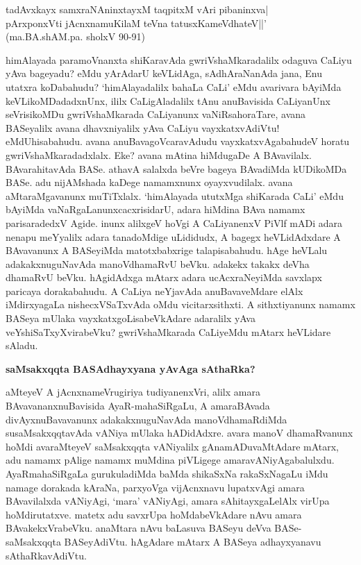 \begin{shloka}
tadAvxkayx samxraNAninxtayxM taqpitxM vAri pibaninxva|\\
pArxponxVti jAcnxnamuKilaM teVna tatusxKameVdhateV||'\\
\hfill(ma.BA.shAM.pa. sholxV 90-91)
\end{shloka}

himAlayada paramoVnanxta shiKaravAda gwriVshaMkaradalilx odaguva CaLiyu yAva bageyadu? eMdu yArAdarU keVLidAga, sAdhAraNanAda jana, Enu utatxra koDabahudu?  `himAlayadalilx bahaLa CaLi' eMdu avarivara bAyiMda keVLikoMDadadxnUnx, ililx CaLigAladalilx tAnu anuBavisida CaLiyanUnx seVrisikoMDu gwriVshaMkarada CaLiyanunx vaNiRsahoraTare, avana BASeyalilx avana dhavxniyalilx yAva CaLiyu vayxkatxvAdiVtu! eMdUhisabahudu. avana anuBavagoVcaravAdudu vayxkatxvAgabahudeV horatu gwriVshaMkaradadxlalx. Eke? avana mAtina hiMdugaDe A BAvavilalx. BAvarahitavAda BASe. athavA salalxda beVre bageya BAvadiMda kUDikoMDa BASe. adu nijAMshada kaDege namamxnunx oyayxvudilalx. avana aMtaraMgavanunx muTiTxlalx. `himAlayada ututxMga shiKarada CaLi' eMdu bAyiMda vaNaRgaLanunxcacxrisidarU, adara hiMdina BAva namamx parisaradedxV Agide. inunx alilxgeV hoVgi A CaLiyanenxV PiVlf mADi adara nenapu meYyalilx adara tanadoMdige uLididudx, A bagegx heVLidAdxdare A BAvavanunx A BASeyiMda matotxbabxrige talapisabahudu. hAge heVLalu adakakxnuguNavAda manoVdhamaRvU beVku. adakekx takakx deVha dhamaRvU beVku. hAgidAdxga mAtarx adara ucAcxraNeyiMda savxlapx paricaya dorakabahudu. A CaLiya neYjavAda anuBavaveMdare elAlx iMdirxyagaLa nishecxVSaTxvAda oMdu vicitarxsithxti. A sithxtiyanunx namamx BASeya mUlaka vayxkatxgoLisabeVkAdare adaralilx yAva veYshiSaTxyXvirabeVku? gwriVshaMkarada CaLiyeMdu mAtarx heVLidare sAladu.

\noindent
\textbf{saMsakxqqta BASAdhayxyana yAvAga sAthaRka?}\label{page27}

aMteyeV A jAcnxnameVrugiriya tudiyanenxVri, alilx amara BAvavananxnuBavisida AyaR-mahaSiRgaLu, A amaraBAvada divAyxnuBavavanunx adakakxnuguNavAda manoVdhamaRdiMda susaMsakxqqtavAda vANiya mUlaka hADidAdxre. avara manoV dhamaRvanunx hoMdi avaraMteyeV saMsakxqqta vANiyalilx gAnamADuvaMtAdare mAtarx, adu namamx pAlige namamx muMdina piVLigege amaravANiyAgabalulxdu. AyaRmahaSiRgaLa gurukuladiMda baMda shikaSxNa rakaSxNagaLu iMdu namage dorakada kAraNa, parxyoVga
vijAcnxnavu lupatxvAgi amara BAvavilalxda vANiyAgi, `mara' vANiyAgi, amara sAhitayxgaLelAlx virUpa hoMdirutatxve. matetx adu savxrUpa hoMdabeVkAdare nAvu amara BAvakekxVrabeVku. anaMtara nAvu baLasuva BASeyu deVva BASe-saMsakxqqta BASeyAdiVtu. hAgAdare mAtarx A BASeya adhayxyanavu sAthaRkavAdiVtu.

